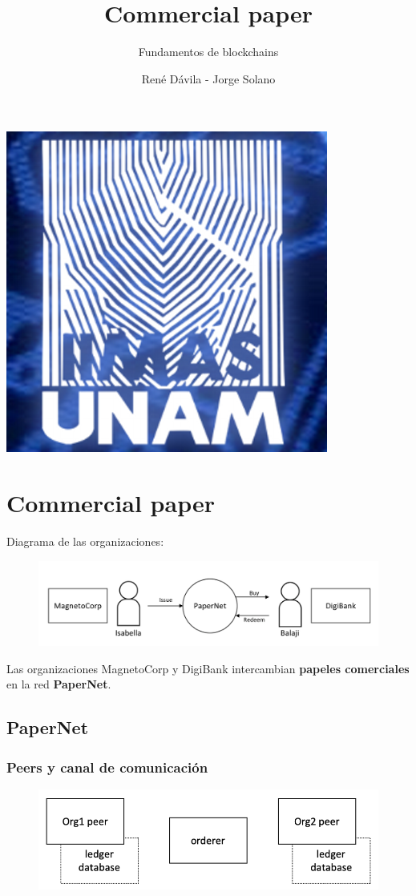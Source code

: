 \documentclass{beamer}
\title[]{Commercial paper}
\subtitle{Fundamentos de blockchains}
\author{René Dávila - Jorge Solano}
\date{ }
\begin{document}
	\EnableBpAbbreviations
	\begin{frame}
		\begin{center}
			\includegraphics [width =0.2 \textwidth ]{iimas}
		\end{center}
		\titlepage 
	\end{frame}

	\section{Commercial paper}
	
	\begin{frame}
		Diagrama de las organizaciones:
		\begin{figure}[h]
			\includegraphics[scale=.5]{papernet_01}
			\centering
		\end{figure}
		Las organizaciones MagnetoCorp y DigiBank intercambian \textbf{papeles comerciales} en la red \textbf{PaperNet}.
	\end{frame}
	
	\subsection{PaperNet}

	\begin{frame}
		\frametitle{Peers y canal de comunicación}
		\begin{figure}[h]
			\includegraphics[scale=.5]{papernet_02}
			\centering
		\end{figure}
	\end{frame}
	
\end{document}

